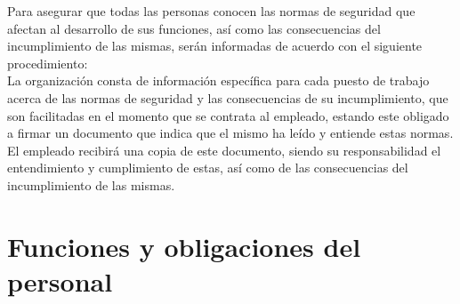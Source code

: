 \documentclass[a4paper,11pt,bibtotoc,noliststotoc]{scrbook}
\begin{document}
Para asegurar que todas las personas conocen las normas de seguridad que afectan al desarrollo de sus funciones, así como las consecuencias del incumplimiento de las mismas, serán informadas de acuerdo con el siguiente procedimiento: \\
La organización consta de información específica para cada puesto de trabajo acerca de las normas de seguridad y las consecuencias de su incumplimiento, que son facilitadas en el momento que se contrata al empleado, estando este obligado a firmar un documento que indica que el mismo ha leído y entiende estas normas. El empleado recibirá una copia de este documento, siendo su responsabilidad el entendimiento y cumplimiento de estas, así como de las consecuencias del incumplimiento de las mismas.





\chapter{Funciones y obligaciones del personal}
\end{document}
